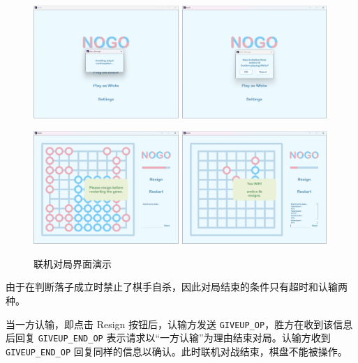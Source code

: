 \documentclass{noithesis}
\begin{document}
   \begin{figure}[!htb]
    	\centering
    	
    	\includegraphics[width=5.5cm]{img/web4.png}
    	\includegraphics[width=5.5cm]{img/web5.png}
    	
    	\includegraphics[width=5.5cm]{img/web2.png}
    	\includegraphics[width=5.5cm]{img/web3.png}
    	
    	\caption{联机对局界面演示}
    \end{figure}
    
    由于在判断落子成立时禁止了棋手自杀，因此对局结束的条件只有超时和认输两种。
    
    当一方认输，即点击 Resign 按钮后，认输方发送 \verb|GIVEUP_OP|，胜方在收到该信息后回复 \verb|GIVEUP_END_OP| 表示请求以“一方认输”为理由结束对局。认输方收到 \verb|GIVEUP_END_OP| 回复同样的信息以确认。此时联机对战结束，棋盘不能被操作。
    
\end{document}
